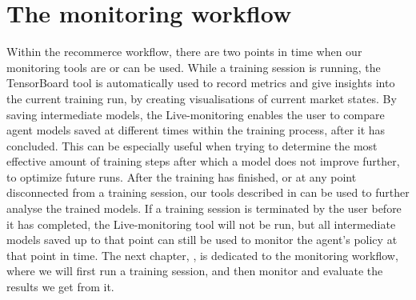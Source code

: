 
\section{The monitoring workflow}

Within the recommerce workflow, there are two points in time when our monitoring tools are or can be used. While a training session is running, the TensorBoard tool is automatically used to record metrics and give insights into the current training run, by creating visualisations of current market states. By saving intermediate models, the Live-monitoring enables the user to compare agent models saved at different times within the training process, after it has concluded. This can be especially useful when trying to determine the most effective amount of training steps after which a model does not improve further, to optimize future runs. After the training has finished, or at any point disconnected from a training session, our tools described in  can be used to further analyse the trained models. If a training session is terminated by the user before it has completed, the Live-monitoring tool will not be run, but all intermediate models saved up to that point can still be used to monitor the agent's policy at that point in time. The next chapter, , is dedicated to the monitoring workflow, where we will first run a training session, and then monitor and evaluate the results we get from it.


